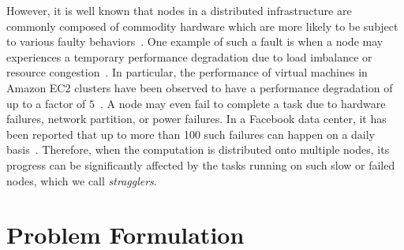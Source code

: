 \documentclass{report}
\begin{document}
However, it is well known that nodes in a distributed infrastructure are commonly composed of commodity hardware which are more likely to be subject to various faulty behaviors~\cite{Huang2017a}. 
One example of such a fault is when a node may experiences a temporary performance degradation due to load imbalance or resource congestion~\cite{Lee2018a}. 
In particular, the performance of virtual machines in Amazon EC2 clusters have been observed to have a performance degradation of up to a factor of $5$~\cite{Tandon2017, Lee2018a}. 
A node may even fail to complete a task due to hardware failures, network partition, or power failures. 
In a Facebook data center, it has been reported that up to more than 100 such failures can happen on a daily basis~\cite{Rashmi2013,Sathiamoorthy2013}.
Therefore, when the computation is distributed onto multiple nodes, its progress can be significantly affected by the tasks running on such slow or failed
nodes, which we call {\em stragglers}.

\section{Problem Formulation}
\end{document}

